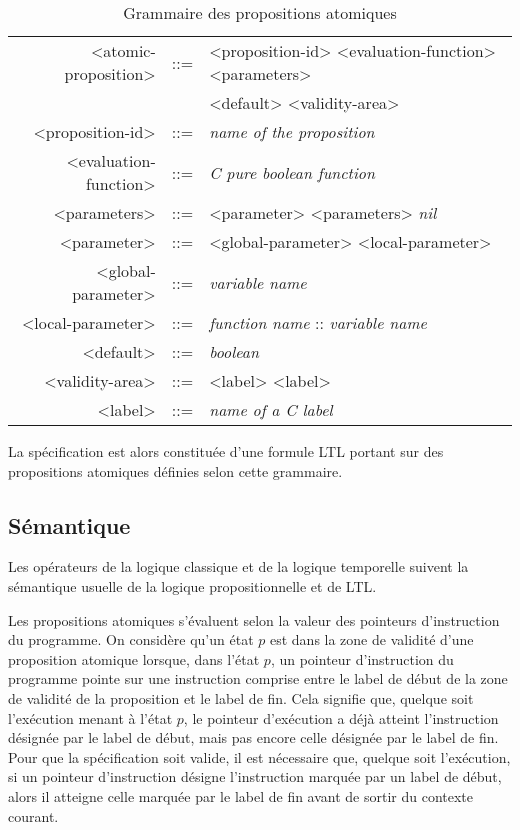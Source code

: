 \begin{table}[ht]
\centering
\caption{Grammaire des propositions atomiques}
\label{tab:spe_gram}
\begin{tabular}[]{@{}rcl@{}}
\hline
<atomic-proposition>  & ::= & <proposition-id> <evaluation-function> <parameters>\\
                      &     &  <default> <validity-area>\\
<proposition-id>      & ::= & \emph{name of the proposition}\\
<evaluation-function> & ::= & \emph{C pure boolean function}\\
<parameters>          & ::= & <parameter> <parameters> \textbar{} \emph{nil}\\
<parameter>           & ::= & <global-parameter> \textbar{} <local-parameter>\\
<global-parameter>    & ::= & \emph{variable name}\\
<local-parameter>     & ::= & \emph{function name} :: \emph{variable name}\\
<default>             & ::= & \emph{boolean}\\
<validity-area>       & ::= & <label> <label>\\
<label>               & ::= & \emph{name of a C label}\\
\hline
\end{tabular}
\end{table}

La spécification est alors constituée d'une formule LTL portant sur des
propositions atomiques définies selon cette grammaire.

\subsection{Sémantique}

Les opérateurs de la logique classique et de la logique temporelle
suivent la sémantique usuelle de la logique propositionnelle et de LTL.

Les propositions atomiques s'évaluent selon la valeur des pointeurs
d'instruction du programme. On considère qu'un état \(p\) est dans la zone de
validité d'une proposition atomique lorsque, dans l'état \(p\), un pointeur
d'instruction du programme pointe sur une instruction comprise entre le label de
début de la zone de validité de la proposition et le label de fin. Cela signifie
que, quelque soit l'exécution menant à l'état \(p\), le pointeur d'exécution a
déjà atteint l'instruction désignée par le label de début, mais pas encore celle
désignée par le label de fin. Pour que la spécification soit valide, il est
nécessaire que, quelque soit l'exécution, si un pointeur d'instruction désigne
l'instruction marquée par un label de début, alors il atteigne celle marquée par
le label de fin avant de sortir du contexte courant.

